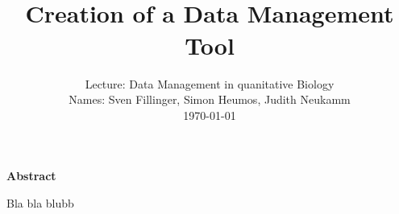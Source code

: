 \documentclass[paper=a4, fontsize=12pt]{scrartcl}	%
\title{
		\usefont{OT1}{bch}{b}{n}
		\horrule{0.5pt} \\[0.4cm]
		\LARGE Creation of a Data Management Tool
		\horrule{2pt} \\%
}
\author{
		\normalfont 								\normalsize
			Lecture: Data Management in quanitative Biology\\					\normalsize
     		Names: Sven Fillinger, Simon Heumos, Judith Neukamm\\					\normalsize
       		 \today
}
\date{}
\numberwithin{equation}{section}		%
\numberwithin{figure}{section}			%
\numberwithin{table}{section}				%
\begin{document}
\maketitle

\centerline{\bf Abstract}
Bla bla blubb
\noindent

\newpage









\newpage


\end{document}
